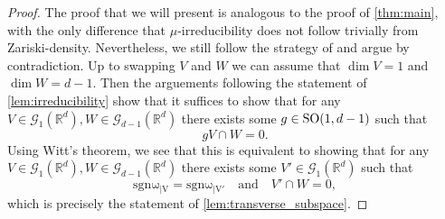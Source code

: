 \documentclass{report}
\begin{document}
\begin{proof}
    The proof that we will present is analogous to the proof of \cref{thm:main}, with the only difference that $\mu$-irreducibility does not follow trivially from Zariski-density.
    Nevertheless, we still follow the strategy of \cite{pozzetti_anosov_2023} and argue by contradiction.
    Up to swapping $V$ and $W$ we can assume that $\dim V = 1$ and $\dim W = d - 1$.
    Then the arguements following the statement of \cref{lem:irreducibility} show that it suffices to show that for any $V \in \mathcal G_1(\mathbb R^d), W \in \mathcal G_{d-1}(\mathbb R^d)$ there exists some $g \in \operatorname{{\mathrm{SO}}}(1,d-1)$ such that
    \[
    g V \cap W = 0.
    \]  
    Using Witt's theorem, we see that this is equivalent to showing that for any $V \in \mathcal G_1(\mathbb R^d), W \in \mathcal G_{d-1}(\mathbb R^d)$ there exists some $V' \in \mathcal G_1(\mathbb R^d)$ such that
    \[
    \mathrm{sgn \omega_{|V}} = \mathrm{sgn \omega_{|V'}} \quad \text{and} \quad V' \cap W = 0,
    \]
    which is precisely the statement of \cref{lem:transverse_subspace}.
\end{proof}
\end{document}
